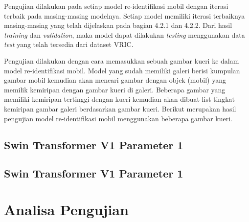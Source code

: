 Pengujian dilakukan pada setiap model re-identifikasi mobil dengan iterasi terbaik pada masing-masing modelnya. Setiap 
model memiliki iterasi terbaiknya masing-masing yang telah dijelaskan pada bagian 4.2.1 dan 4.2.2. Dari hasil \emph{training} 
dan \emph{validation}, maka model dapat dilakukan \emph{testing} menggunakan data \emph{test} yang telah tersedia dari 
dataset VRIC.

Pengujian dilakukan dengan cara memasukkan sebuah gambar kueri ke dalam model re-identifikasi mobil. Model yang sudah memiliki 
galeri berisi kumpulan gambar mobil kemudian akan mencari gambar dengan objek (mobil) yang memilik kemiripan dengan gambar 
kueri di galeri. Beberapa gambar yang memiliki kemiripan tertinggi dengan kueri kemudian akan dibuat list tingkat kemiripan 
gambar galeri berdasarkan gambar kueri. Berikut merupakan hasil pengujian model re-identifikasi mobil menggunakan beberapa 
gambar kueri.

\subsection{Swin Transformer V1 Parameter 1}


\subsection{Swin Transformer V1 Parameter 1}

\section{Analisa Pengujian}
\label{sec:analisapengujian}



